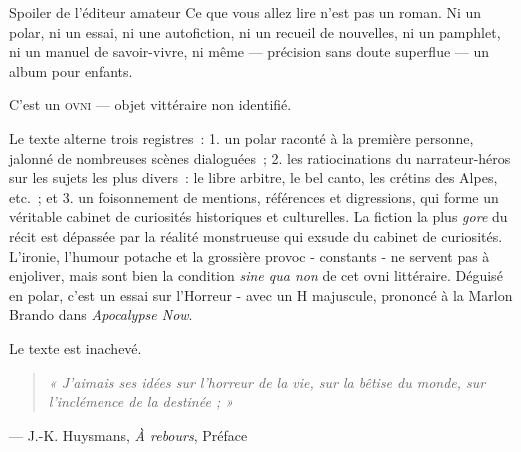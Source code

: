 \thispagestyle{empty}
\vspace*{2\onelineskip}

\begin{editorialnote}{Spoiler de l'éditeur amateur}
Ce que vous allez lire n'est pas un roman. Ni un polar, ni un essai,
ni une autofiction, ni un recueil de nouvelles, ni un pamphlet, ni un manuel
de savoir-vivre, ni même — précision sans doute superflue — un album pour enfants.

C'est un \textsc{ovni} — objet vittéraire non identifié.

Le texte alterne trois registres~: 1. un polar raconté à la première personne, jalonné de nombreuses scènes dialoguées~; 2. les ratiocinations du narrateur-héros sur les sujets les plus divers~: le libre arbitre, le bel canto, les crétins des Alpes, etc.~; et 3. un foisonnement de mentions, références et digressions, qui forme un véritable cabinet de curiosités historiques et culturelles. La fiction la plus \textit{gore} du récit est dépassée par la réalité monstrueuse qui exsude du cabinet de curiosités. L'ironie, l'humour potache et la grossière provoc - constants - ne servent pas à enjoliver, mais sont bien la condition \textit{sine qua non} de cet ovni littéraire. Déguisé en polar, c'est un essai sur l'Horreur - avec un H majuscule, prononcé à la Marlon Brando dans \textit{Apocalypse Now}.


Le texte est inachevé.
\end{editorialnote}

\thispagestyle{empty}
\vspace*{3\onelineskip}

\begin{quote}
\itshape « J’aimais ses idées sur l’horreur de la vie, sur la bêtise du monde, sur l’inclémence de la destinée ; »
\end{quote}
\begin{flushright}
\normalfont — J.-K. Huysmans, \textit{À rebours}, Préface
\end{flushright}

\cleardoublepage
